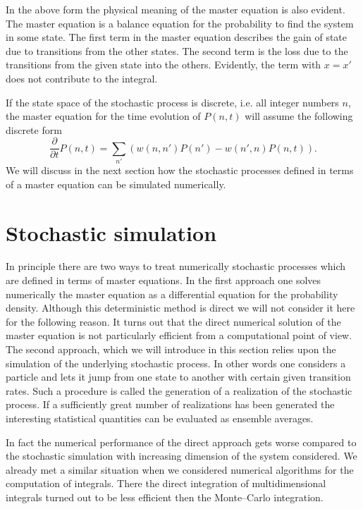In the above form the physical meaning of the master equation is 
also evident. The master equation is a balance equation for the
probability to find the system in some state. The first term in 
the master equation describes the gain of state due to transitions 
from the other states. The second term is the loss due to the 
transitions from the given state into the others. Evidently,
the term with $x=x'$ does not contribute to the integral.

If the state space of the stochastic process is discrete, i.e.
all integer numbers $n$,
the master equation for the time evolution of $P(n,t)$ will assume 
the following discrete form
\begin{equation}
\label{MASTER_JUMP_P_N}
\frac{\partial}{\partial t} P(n,t) =
 \sum_{n'} \left( w(n,n') P(n')
 - w(n',n) P(n,t) \right).
\end{equation}
We will discuss in the next section how the stochastic processes 
defined in terms of a master equation can be simulated 
numerically.


\section{Stochastic simulation}
In principle there are two ways to treat numerically
stochastic processes which are defined in terms of master
equations. In the first approach one solves numerically the
master equation as a differential equation for the probability
density. Although this deterministic method is direct we will not consider it 
here for the following reason. It  turns out that the direct 
numerical solution of the master equation is not particularly 
efficient from a computational point of view. The second approach,
which we will introduce in this section relies upon the simulation 
of the underlying stochastic process. In other words one considers 
a particle and lets it jump from one state to another with certain 
given transition rates. Such a procedure is called the generation 
of a realization of the stochastic process. If a sufficiently 
great number of realizations has been generated the interesting 
statistical quantities can be evaluated as ensemble averages.

In fact the numerical performance of the direct approach gets 
worse compared to the stochastic simulation with increasing 
dimension of the system considered. We already met a similar 
situation when we considered numerical algorithms for the 
computation of integrals. There the direct integration of 
multidimensional integrals turned out to be less efficient then 
the Monte--Carlo integration.

